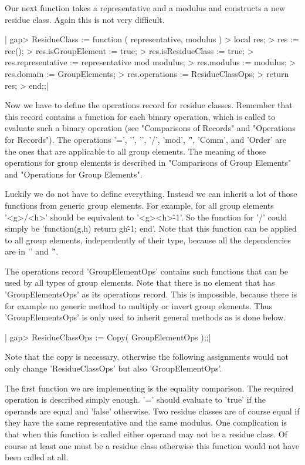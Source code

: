 Our next  function takes a representative and  a modulus and constructs a
new residue class.  Again this is not very difficult.

|    gap> ResidueClass := function ( representative, modulus )
    >     local res;
    >     res := rec();
    >     res.isGroupElement  := true;
    >     res.isResidueClass  := true;
    >     res.representative  := representative mod modulus;
    >     res.modulus         := modulus;
    >     res.domain          := GroupElements;
    >     res.operations      := ResidueClassOps;
    >     return res;
    > end;;|

Now  we  have to   define   the operations record for   residue  classes.
Remember that this record contains a function  for each binary operation,
which is called to evaluate such a  binary operation (see "Comparisons of
Records" and "Operations for Records").  The  operations '=', '\<', '\*',
'/', 'mod', '\^', 'Comm', and 'Order' are the ones that are applicable to
all group  elements.  The meaning of those  operations for group elements
is described in "Comparisons of Group Elements" and "Operations for Group
Elements".

Luckily  we do  not have  to define everything.  Instead we can inherit a
lot of those functions from generic group elements.  For example, for all
group elements '<g>/<h>' should be equivalent to '<g>\*<h>\^-1'.  So  the
function for '/'  could  simply be 'function(g,h)  return g\*h\^-1; end'.
Note  that   this   function  can  be  applied  to  all  group  elements,
independently of their type, because all the dependencies are in '\*' and
'\^'.

The operations record 'GroupElementOps' contains  such functions that can
be used by all types of group elements.  Note  that there  is  no element
that has   'GroupElementsOps'   as  its   operations   record.   This  is
impossible, because there is for example no generic method to multiply or
invert group elements.   Thus 'GroupElementsOps' is  only used to inherit
general methods as is done below.

|    gap> ResidueClassOps := Copy( GroupElementOps );;|

Note that  the copy  is  necessary, otherwise the  following  assignments
would not only change 'ResidueClassOps' but also 'GroupElementOps'.

The first function  we are implementing is  the equality comparison.  The
required operation is described  simply enough.   '='  should evaluate to
'true' if the  operands are  equal and  'false' otherwise.   Two  residue
classes are of course equal  if they have the same representative and the
same modulus.   One complication is  that when  this  function is  called
either operand may not  be a residue class.  Of course at least one  must
be a residue  class otherwise this function would not have been called at
all.

